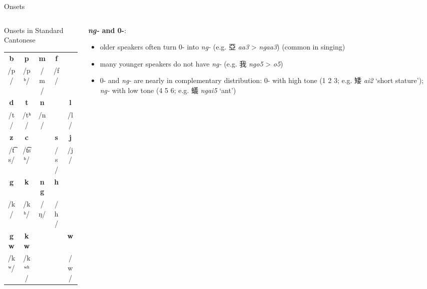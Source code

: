\documentclass{beamer}
\begin{document}
\begin{frame}[fragile]{Onsets}

\begin{columns}
    \begin{column}{0.5\textwidth}
        Onsets in Standard Cantonese\\
        \bigskip
        \begin{tabular}{c c c c c}
            \hline
            \textbf{b} & \textbf{p} & \textbf{m} & \textbf{f} & \\ 
            /p/ & /pʰ/ & /m/ & /f/ & \\ \hline
            \textbf{d} & \textbf{t} & \textbf{n} & & \textbf{l} \\
            /t/ & /tʰ/ & /n/ & & /l/ \\ \hline
            \textbf{z} & \textbf{c} & & \textbf{s} & \textbf{j} \\
            /t͡s/ & /t͡sʰ/ & & /s/ & /j/ \\ \hline
            \textbf{g} & \textbf{k} & \textbf{ng} & \textbf{h} & \\
            /k/ & /kʰ/ & /ŋ/ & /h/ & \\ \hline
            \textbf{gw} & \textbf{kw} & & & \textbf{w} \\
            /kʷ/ & /kʷʰ/ & & & /w/ \\ \hline
        \end{tabular}
    \end{column}
    \begin{column}{0.5\textwidth} 
        \textbf{\emph{ng-} and 0-}:
        \begin{itemize}
            \item older speakers often turn 0- into \emph{ng-} (e.g. 亞 \emph{aa3} > \emph{ngaa3}) {\scriptsize (common in singing)}
            \item many younger speakers do not have \emph{ng-} (e.g. 我 \emph{ngo5} > \emph{o5})
            \item 0- and \emph{ng-} are nearly in complementary distribution: 0- with high tone (1 2 3; e.g. 矮 \emph{ai2} \enquote*{short stature}); \emph{ng-} with low tone (4 5 6; e.g. 蟻 \emph{ngai5} \enquote*{ant})
        \end{itemize}
    \end{column}
\end{columns}

\end{frame}
\end{document}
